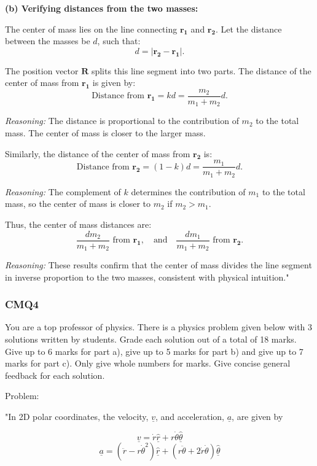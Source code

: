 \textbf{(b) Verifying distances from the two masses:}

The center of mass lies on the line connecting $\mathbf{r_1}$ and $\mathbf{r_2}$. Let the distance between the masses be $d$, such that:
\[
d = |\mathbf{r_2} - \mathbf{r_1}|.
\]

The position vector $\mathbf{R}$ splits this line segment into two parts. The distance of the center of mass from $\mathbf{r_1}$ is given by:
\[
\text{Distance from } \mathbf{r_1} = k d = \frac{m_2}{m_1 + m_2} d.
\]

\textit{Reasoning:} The distance is proportional to the contribution of $m_2$ to the total mass. The center of mass is closer to the larger mass.

Similarly, the distance of the center of mass from $\mathbf{r_2}$ is:
\[
\text{Distance from } \mathbf{r_2} = (1 - k) d = \frac{m_1}{m_1 + m_2} d.
\]

\textit{Reasoning:} The complement of $k$ determines the contribution of $m_1$ to the total mass, so the center of mass is closer to $m_2$ if $m_2 > m_1$.

Thus, the center of mass distances are:
\[
\frac{dm_2}{m_1 + m_2} \text{ from } \mathbf{r_1}, \quad \text{and} \quad \frac{dm_1}{m_1 + m_2} \text{ from } \mathbf{r_2}.
\]

\textit{Reasoning:} These results confirm that the center of mass divides the line segment in inverse proportion to the two masses, consistent with physical intuition."


\subsubsection{CMQ4}

You are a top professor of physics. There is a physics problem given below with 3 solutions written by students. Grade each solution out of a total of 18 marks. Give up to 6 marks for part a), give up to 5 marks for part b) and give up to 7 marks for part c). Only give whole numbers for marks. Give concise general feedback for each solution.

Problem:

"In 2D polar coordinates, the velocity, \( \underline{v} \), and acceleration, \( \underline{a} \), are given by 

\[ 
\underline{v} = \dot{r} \underline{\hat{r}} + r \dot{\theta} \underline{\hat{\theta}} 
\]
\[ 
\underline{a} = (\ddot{r} - r \dot{\theta}^{2}) \underline{\hat{r}} + (r \ddot{\theta} + 2\dot{r}\dot{\theta} ) \underline{\hat{\theta}} 
\]
    

